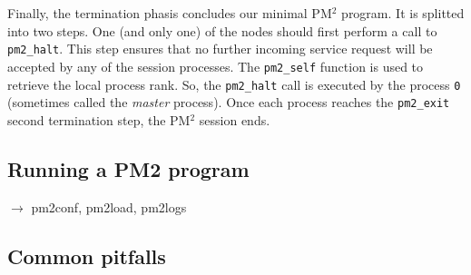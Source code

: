\documentclass[a4paper,11pt]{article}
\def\pm2{PM$^2$\xspace}
\begin{document}
Finally, the termination phasis concludes our minimal \pm2 program. It
is splitted into two steps. One (and only one) of the nodes should
first perform a call to \texttt{pm2\_halt}. This step ensures that no
further incoming service request will be accepted by any of the
session processes. The \texttt{pm2\_self} function is used to retrieve
the local process rank. So, the \texttt{pm2\_halt} call is executed by
the process \texttt{0} (sometimes called the \emph{master} process).
Once each process reaches the \texttt{pm2\_exit} second termination
step, the \pm2 session ends.

\subsection{Running a PM2 program}
        $\rightarrow$ pm2conf, pm2load, pm2logs

\subsection{Common pitfalls}

\end{document}
